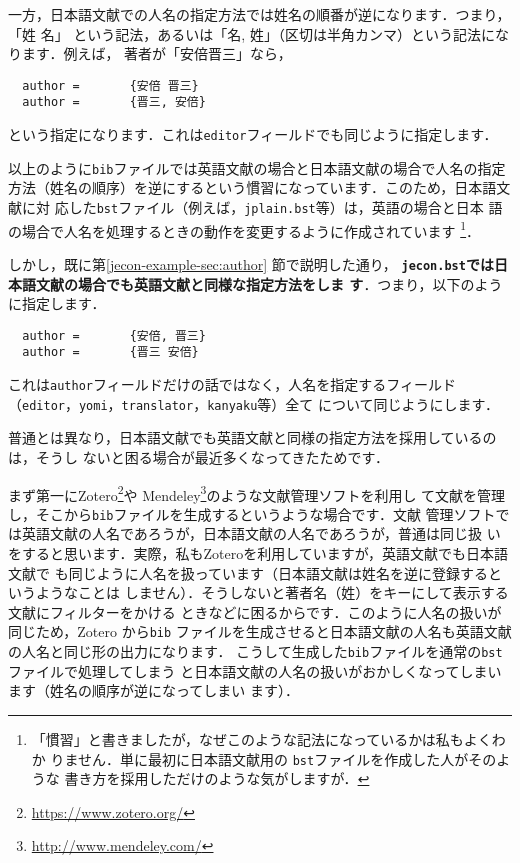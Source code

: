 \documentclass[article]{jlreq}
\begin{document}
一方，日本語文献での人名の指定方法では姓名の順番が逆になります．つまり，「姓 名」
という記法，あるいは「名, 姓」（区切は半角カンマ）という記法になります．例えば，
著者が「安倍晋三」なら，
\begin{screen}
 \begin{verbatim}
  author =       {安倍 晋三}
  author =       {晋三, 安倍}
 \end{verbatim}
\end{screen}
という指定になります．これは\texttt{editor}フィールドでも同じように指定します．
\vspace*{1em}

以上のように\texttt{bib}ファイルでは英語文献の場合と日本語文献の場合で人名の指定
方法（姓名の順序）を逆にするという慣習になっています．このため，日本語文献に対
応した\texttt{bst}ファイル（例えば，\texttt{jplain.bst}等）は，英語の場合と日本
語の場合で人名を処理するときの動作を変更するように作成されています
\footnote{「慣習」と書きましたが，なぜこのような記法になっているかは私もよくわか
りません．単に最初に日本語文献用の \texttt{bst}ファイルを作成した人がそのような
書き方を採用しただけのような気がしますが．}．\vspace*{1em}

しかし，既に第\ref{jecon-example-sec:author} 節で説明した通り，
\textbf{\texttt{jecon.bst}では日本語文献の場合でも英語文献と同様な指定方法をしま
す}．つまり，以下のように指定します．
\begin{screen}
 \begin{verbatim}
  author =       {安倍, 晋三}
  author =       {晋三 安倍}
 \end{verbatim}
\end{screen}

これは\texttt{author}フィールドだけの話ではなく，人名を指定するフィールド
（\texttt{editor}，\texttt{yomi}，\texttt{translator}，\texttt{kanyaku}等）全て
について同じようにします．

\vspace*{1em}
普通とは異なり，日本語文献でも英語文献と同様の指定方法を採用しているのは，そうし
ないと困る場合が最近多くなってきたためです．

まず第一にZotero\footnote{\url{https://www.zotero.org/}}や
Mendeley\footnote{\url{http://www.mendeley.com/}}のような文献管理ソフトを利用し
て文献を管理し，そこから\texttt{bib}ファイルを生成するというような場合です．文献
管理ソフトでは英語文献の人名であろうが，日本語文献の人名であろうが，普通は同じ扱
いをすると思います．実際，私もZoteroを利用していますが，英語文献でも日本語文献で
も同じように人名を扱っています（日本語文献は姓名を逆に登録するというようなことは
しません）．そうしないと著者名（姓）をキーにして表示する文献にフィルターをかける
ときなどに困るからです．このように人名の扱いが同じため，Zotero から\texttt{bib}
ファイルを生成させると日本語文献の人名も英語文献の人名と同じ形の出力になります．
こうして生成した\texttt{bib}ファイルを通常の\texttt{bst}ファイルで処理してしまう
と日本語文献の人名の扱いがおかしくなってしまいます（姓名の順序が逆になってしまい
ます）．\vspace*{1em}
\end{document}
